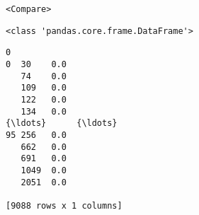 \documentclass[11pt]{article}
\makeatletter
\newcommand{\boxspacing}{\kern\kvtcb@left@rule\kern\kvtcb@boxsep}
\newcommand{\prompt}[4]{
        {\ttfamily\llap{{\color{#2}[#3]:\hspace{3pt}#4}}\vspace{-\baselineskip}}
    }
\makeatother
\begin{document}
            \begin{tcolorbox}[breakable, size=fbox, boxrule=.5pt, pad at break*=1mm, opacityfill=0]
\prompt{Out}{outcolor}{178}{\boxspacing}
\begin{Verbatim}[commandchars=\\\{\}]
<Compare>
\end{Verbatim}
\end{tcolorbox}
        
    \begin{Verbatim}[commandchars=\\\{\}]
<class 'pandas.core.frame.DataFrame'>
    \end{Verbatim}

            \begin{tcolorbox}[breakable, size=fbox, boxrule=.5pt, pad at break*=1mm, opacityfill=0]
\prompt{Out}{outcolor}{178}{\boxspacing}
\begin{Verbatim}[commandchars=\\\{\}]
           0
0  30    0.0
   74    0.0
   109   0.0
   122   0.0
   134   0.0
{\ldots}      {\ldots}
95 256   0.0
   662   0.0
   691   0.0
   1049  0.0
   2051  0.0

[9088 rows x 1 columns]
\end{Verbatim}
\end{tcolorbox}
        
\end{document}
